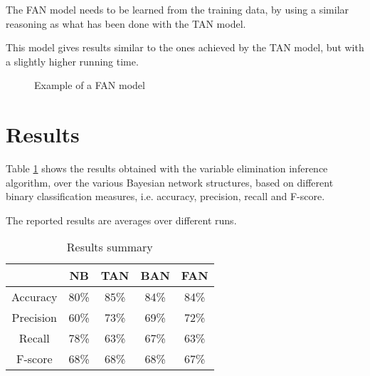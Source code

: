 \documentclass[twoside,twocolumn]{article}
\begin{document}
The FAN model needs to be learned from the training data, by using a similar reasoning as what has been done with the TAN model.

This model gives results similar to the ones achieved by the TAN model, but with a slightly higher running time.

\begin{figure}[h]
  \caption{Example of a FAN model}
  \centering
  \label{fig:fan}
\end{figure}


\section{Results}

Table \ref{table:results} shows the results obtained with the variable elimination inference algorithm, 
over the various Bayesian network structures, based on different binary classification measures, i.e. accuracy, precision, recall and F-score.

The reported results are averages over different runs.

\begin{table}[h]
  \caption{Results summary}
  \begin{center}
  \begin{tabular}{|c|c|c|c|c|}
  \hline
            & NB   & TAN  & BAN  & FAN  \\ \hline
  Accuracy  & 80\% & 85\% & 84\% & 84\% \\ \hline
  Precision & 60\% & 73\% & 69\% & 72\% \\ \hline
  Recall    & 78\% & 63\% & 67\% & 63\% \\ \hline
  F-score   & 68\% & 68\% & 68\% & 67\% \\ \hline
  \end{tabular}
  \end{center}
  \label{table:results}
\end{table}

\end{document}
